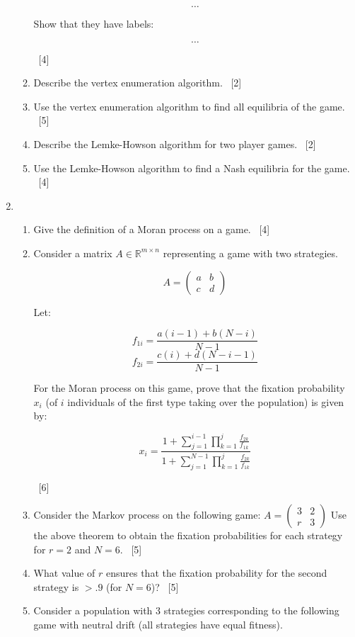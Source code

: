 \documentclass[12pt,a4paper]{article}
\begin{document}
\begin{enumerate}
\begin{enumerate}
             \[
             \dots
             \]

             Show that they have labels:

             \[
             \dots
             \]

             ~\hfill{[4]}

         \item Describe the vertex enumeration algorithm.
             ~\hfill{[2]}

         \item Use the vertex enumeration algorithm to find all equilibria of
             the game.
             ~\hfill{[5]}

         \item Describe the Lemke-Howson algorithm for two player games.
             ~\hfill{[2]}

         \item Use the Lemke-Howson algorithm to find a Nash equilibria for the
             game.
             ~\hfill{[4]}
    \end{enumerate}

\newpage
\item

    \begin{enumerate}
        \item Give the definition of a Moran process on a game.
            ~\hfill{[4]}
		\item Consider a matrix $A\in\mathbb{R}^{m\times n}$ representing a
game with two strategies.

			$$ A= \begin{pmatrix} a & b\\ c & d \end{pmatrix} $$

			Let:

			$$f_{1i}=\frac{a(i-1)+b(N-i)}{N-1}$$
$$f_{2i}=\frac{c(i)+d(N-i-1)}{N-1}$$

			For the Moran process on this game, prove that the fixation
probability \(x_i\) (of \(i\) individuals of the first type taking over the
population) is given by:

			$$
x_i=\frac{1+\sum_{j=1}^{i-1}\prod_{k=1}^j\frac{f_{2k}}{f_{1k}}}{1+\sum_{j=1}^{N-1}\prod_{k=1}^j\frac{f_{2k}}{f_{1k}}}
$$

            ~\hfill{[6]}
        \item Consider the Markov process on the following game:
        \(A = \begin{pmatrix} 3 & 2\\ r & 3 \end{pmatrix}\)
            Use the above theorem to obtain the fixation probabilities for each
            strategy for \(r=2\) and \(N=6\).
            ~\hfill{[5]}
        \item What value of \(r\) ensures that the fixation probability for the
            second strategy is \(>.9\) (for \(N=6\))?
            ~\hfill{[5]}
        \item Consider a population with 3 strategies corresponding to the
            following game with neutral drift (all strategies have equal
            fitness).


\end{enumerate}
\end{enumerate}
\end{document}
